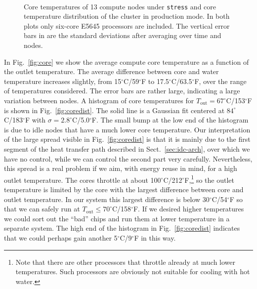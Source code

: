 \begin{figure}[t]
  \centering
  \hfill
  \\
  \vspace*{-3mm}
  \caption{ Core temperatures of 13 compute nodes
    under \texttt{stress} and  core temperature
    distribution of the cluster in production mode.  In both plots
    only six-core E5645 processors are included.  The vertical error
    bars in  are the standard deviations after
    averaging over time and nodes.}
\end{figure}

In Fig.~\ref{fig:core} we show the average compute core temperature as
a function of the outlet temperature.  The average difference between
core and water temperature increases slightly, from
15$^\circ$C/59$^\circ$F to 17.5$^\circ$C/63.5$^\circ$F, over the range
of temperatures considered.  The error bars are rather large,
indicating a large variation between nodes.  A histogram of core
temperatures for $T_{\text{out}}=67^\circ$C/153$^\circ$F is shown in
Fig.~\ref{fig:coredist}.  The solid line is a Gaussian fit centered at
$84^\circ$C/183$^\circ$F with $\sigma=2.8^\circ$C/5.0$^\circ$F.  The
small bump at the low end of the histogram is due to idle nodes that
have a much lower core temperature.  Our interpretation of the large
spread visible in Fig.~\ref{fig:coredist} is that it is mainly due to
the first segment of the heat transfer path described in
Sect.~\ref{sec:idc-arch}, over which we have no control, while we can
control the second part very carefully.  Nevertheless, this spread is
a real problem if we aim, with energy reuse in mind, for a high outlet
temperature.  The cores throttle at about
100$^\circ$C/212$^\circ$F,\footnote{Note that there are other
  processors that throttle already at much lower temperatures.  Such
  processors are obviously not suitable for cooling with hot water.}
so the outlet temperature is limited by the core with the largest
difference between core and outlet temperature.  In our system this
largest difference is below 30$^\circ$C/54$^\circ$F so that we can
safely run at $T_{\text{out}}\le70^\circ$C/158$^\circ$F.  If we
desired higher temperatures we could sort out the ``bad'' chips and
run them at lower temperature in a separate system.  The high end of
the histogram in Fig.~\ref{fig:coredist} indicates that we could
perhaps gain another 5$^\circ$C/9$^\circ$F in this way.

